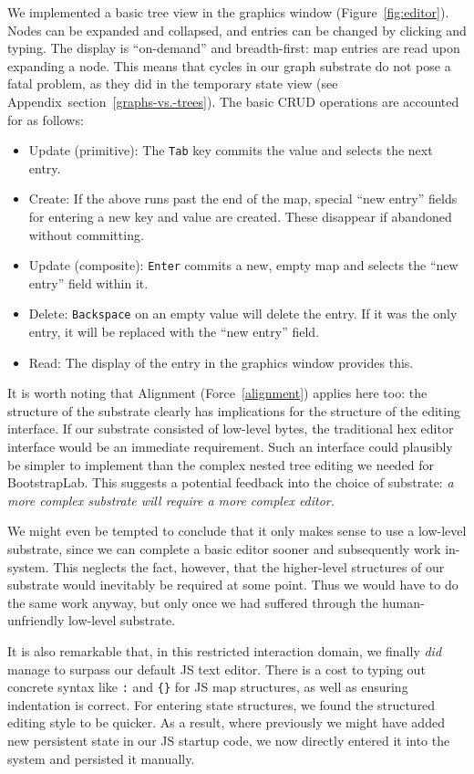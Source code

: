 \documentclass[ twoside,openright,titlepage,numbers=noenddot,headinclude,footinclude,cleardoublepage=empty,abstract=on,
                BCOR=5mm,paper=a4,fontsize=11pt
                ]{scrreprt}
\providecommand{\tightlist}{}\newenvironment{longtable}[2]{\begin{tabular}}{\end{tabular}}
\theoremstyle{definition}
\begin{document}
We implemented a basic tree view in the graphics window
(Figure~\ref{fig:editor}). Nodes can be expanded and collapsed, and
entries can be changed by clicking and typing. The display is
``on-demand'' and breadth-first: map entries are read upon expanding a
node. This means that cycles in our graph substrate do not pose a fatal
problem, as they did in the temporary state view (see
Appendix~section~\ref{graphs-vs.-trees}). The basic CRUD operations are
accounted for as follows:

\begin{itemize}
\tightlist
\item
  Update (primitive): The \texttt{Tab} key commits the value and selects
  the next entry.
\item
  Create: If the above runs past the end of the map, special ``new
  entry'' fields for entering a new key and value are created. These
  disappear if abandoned without committing.
\item
  Update (composite): \texttt{Enter} commits a new, empty map and
  selects the ``new entry'' field within it.
\item
  Delete: \texttt{Backspace} on an empty value will delete the entry. If
  it was the only entry, it will be replaced with the ``new entry''
  field.
\item
  Read: The display of the entry in the graphics window provides this.
\end{itemize}

It is worth noting that Alignment (Force~\ref{alignment}) applies here
too: the structure of the substrate clearly has implications for the
structure of the editing interface. If our substrate consisted of
low-level bytes, the traditional hex editor interface would be an
immediate requirement. Such an interface could plausibly be simpler to
implement than the complex nested tree editing we needed for
BootstrapLab. This suggests a potential feedback into the choice of
substrate: \emph{a more complex substrate will require a more complex
editor.}

We might even be tempted to conclude that it only makes sense to use a
low-level substrate, since we can complete a basic editor sooner and
subsequently work in-system. This neglects the fact, however, that the
higher-level structures of our substrate would inevitably be required at
some point. Thus we would have to do the same work anyway, but only once
we had suffered through the human-unfriendly low-level substrate.

It is also remarkable that, in this restricted interaction domain, we
finally \emph{did} manage to surpass our default \ac{JS} text editor.
There is a cost to typing out concrete syntax like \texttt{:} and
\texttt{\{\}} for \ac{JS} map structures, as well as ensuring
indentation is correct. For entering state structures, we found the
structured editing style to be quicker. As a result, where previously we
might have added new persistent state in our \ac{JS} startup code, we
now directly entered it into the system and persisted it manually.
\end{document}
